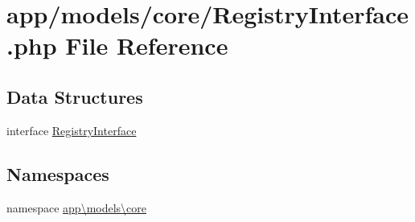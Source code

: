 \hypertarget{_registry_interface_8php}{\section{app/models/core/\-Registry\-Interface.php File Reference}
\label{_registry_interface_8php}
}
\subsection*{Data Structures}
\begin{DoxyCompactItemize}
\item 
interface \hyperlink{interfaceapp_1_1models_1_1core_1_1_registry_interface}{Registry\-Interface}
\end{DoxyCompactItemize}
\subsection*{Namespaces}
\begin{DoxyCompactItemize}
\item 
namespace \hyperlink{namespaceapp_1_1models_1_1core}{app\textbackslash{}models\textbackslash{}core}
\end{DoxyCompactItemize}
